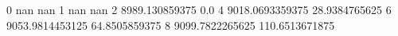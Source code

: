 0 nan nan
1 nan nan
2 8989.130859375 0.0
4 9018.0693359375 28.9384765625
6 9053.9814453125 64.8505859375
8 9099.7822265625 110.6513671875
